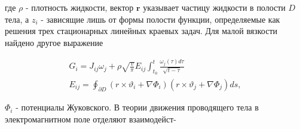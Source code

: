 \documentclass[10pt]{article}
\begin{document}
где $\rho$ - плотность жидкости, вектор $\boldsymbol{r}$ указывает частицу жидкости в полости $D$ тела, а $z_{i}$ - зависящие лишь от формы полости функции, определяемые как решения трех стационарных линейных краевых задач. Для малой вязкости найдено другое выражение



\[

\begin{gathered}

G_{i}=J_{i j} \omega_{j}+\rho \sqrt{\frac{v}{\pi}} E_{i j} \int_{t_{0}}^{t} \frac{\omega_{j}(\tau) d \tau}{\sqrt{t-\tau}} \\

E_{i j}=\oint_{\partial D}\left(r \times \vartheta_{i}+\nabla \Phi_{i}\right)\left(r \times \vartheta_{j}+\nabla \Phi_{j}\right) d s,

\end{gathered}

\]



$\Phi_{i}$ - потенциалы Жуковского. В теории движения проводящего тела в электромагнитном поле отделяют взаимодейст-
\end{document}
